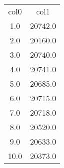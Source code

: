 \begin{table}
\begin{tabular}{cc}
col0 & col1 \\
1.0 & 20742.0 \\
2.0 & 20160.0 \\
3.0 & 20740.0 \\
4.0 & 20741.0 \\
5.0 & 20685.0 \\
6.0 & 20715.0 \\
7.0 & 20718.0 \\
8.0 & 20520.0 \\
9.0 & 20633.0 \\
10.0 & 20373.0 \\
\end{tabular}
\end{table}
